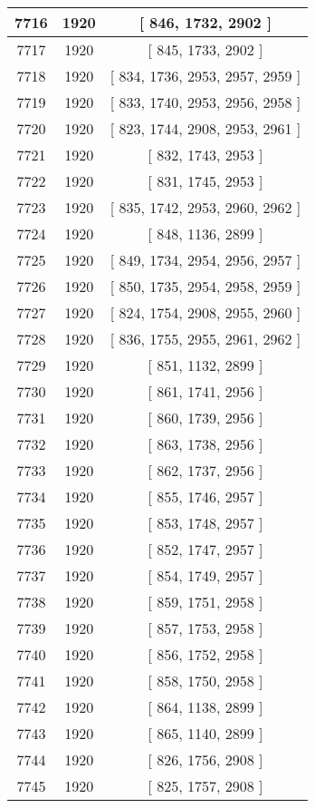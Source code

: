 \begin{center}
\begin{longtable}[H]{|| c c c ||}
\hline
7716 & 1920 & [ 846, 1732, 2902 ] \\ 
\hline
7717 & 1920 & [ 845, 1733, 2902 ] \\ 
\hline
7718 & 1920 & [ 834, 1736, 2953, 2957, 2959 ] \\ 
\hline
7719 & 1920 & [ 833, 1740, 2953, 2956, 2958 ] \\ 
\hline
7720 & 1920 & [ 823, 1744, 2908, 2953, 2961 ] \\ 
\hline
7721 & 1920 & [ 832, 1743, 2953 ] \\ 
\hline
7722 & 1920 & [ 831, 1745, 2953 ] \\ 
\hline
7723 & 1920 & [ 835, 1742, 2953, 2960, 2962 ] \\ 
\hline
7724 & 1920 & [ 848, 1136, 2899 ] \\ 
\hline
7725 & 1920 & [ 849, 1734, 2954, 2956, 2957 ] \\ 
\hline
7726 & 1920 & [ 850, 1735, 2954, 2958, 2959 ] \\ 
\hline
7727 & 1920 & [ 824, 1754, 2908, 2955, 2960 ] \\ 
\hline
7728 & 1920 & [ 836, 1755, 2955, 2961, 2962 ] \\ 
\hline
7729 & 1920 & [ 851, 1132, 2899 ] \\ 
\hline
7730 & 1920 & [ 861, 1741, 2956 ] \\ 
\hline
7731 & 1920 & [ 860, 1739, 2956 ] \\ 
\hline
7732 & 1920 & [ 863, 1738, 2956 ] \\ 
\hline
7733 & 1920 & [ 862, 1737, 2956 ] \\ 
\hline
7734 & 1920 & [ 855, 1746, 2957 ] \\ 
\hline
7735 & 1920 & [ 853, 1748, 2957 ] \\ 
\hline
7736 & 1920 & [ 852, 1747, 2957 ] \\ 
\hline
7737 & 1920 & [ 854, 1749, 2957 ] \\ 
\hline
7738 & 1920 & [ 859, 1751, 2958 ] \\ 
\hline
7739 & 1920 & [ 857, 1753, 2958 ] \\ 
\hline
7740 & 1920 & [ 856, 1752, 2958 ] \\ 
\hline
7741 & 1920 & [ 858, 1750, 2958 ] \\ 
\hline
7742 & 1920 & [ 864, 1138, 2899 ] \\ 
\hline
7743 & 1920 & [ 865, 1140, 2899 ] \\ 
\hline
7744 & 1920 & [ 826, 1756, 2908 ] \\ 
\hline
7745 & 1920 & [ 825, 1757, 2908 ] \\ 

\end{longtable}
\end{center}
